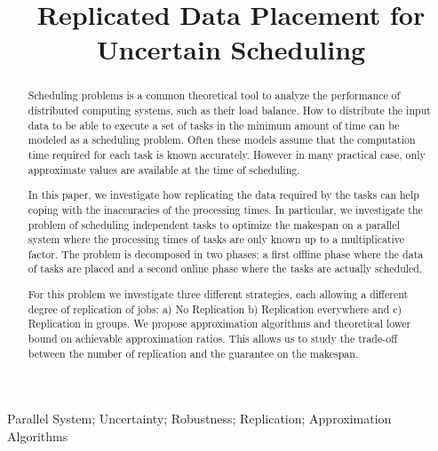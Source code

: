 \documentclass[10pt, conference, compsocconf]{IEEEtran}
\begin{document}
\title{Replicated Data Placement for Uncertain Scheduling}


\author{
}

\maketitle


\begin{abstract}
  Scheduling problems is a common theoretical tool to analyze the
  performance of distributed computing systems, such as their load
  balance. How to distribute the input data to be able to execute a
  set of tasks in the minimum amount of time can be modeled as a
  scheduling problem. Often these models assume that the computation
  time required for each task is known accurately. However in many
  practical case, only approximate values are available at the time of
  scheduling.

  In this paper, we investigate how replicating the data required by
  the tasks can help coping with the inaccuracies of the processing
  times. In particular, we investigate the problem of scheduling
  independent tasks to optimize the makespan on a parallel system
  where the processing times of tasks are only known up to a
  multiplicative factor. The problem is decomposed in two phases: a
  first offline phase where the data of tasks are placed and a second
  online phase where the tasks are actually scheduled.

  For this problem we investigate three different strategies, each
  allowing a different degree of replication of jobs: a) No
  Replication b) Replication everywhere and c) Replication in
  groups. We propose approximation algorithms and theoretical lower
  bound on achievable approximation ratios.  This allows us to study
  the trade-off between the number of replication and the guarantee on
  the makespan.
\end{abstract}

\begin{IEEEkeywords}
Parallel System; Uncertainty; Robustness; Replication; Approximation Algorithms

\end{IEEEkeywords}
\end{document}
